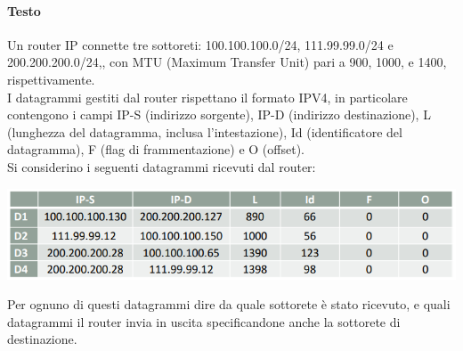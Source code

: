 \documentclass[10pt]{article}
\begin{document}
\paragraph{Testo} Un router IP connette tre sottoreti: 100.100.100.0/24, 111.99.99.0/24 e 200.200.200.0/24,, con MTU (Maximum Transfer Unit) pari a 900, 1000, e 1400, rispettivamente.\\
I datagrammi gestiti dal router rispettano il formato IPV4, in particolare contengono i campi IP-S (indirizzo sorgente), IP-D (indirizzo destinazione), L (lunghezza del datagramma, inclusa l’intestazione), Id (identificatore del datagramma), F (flag di frammentazione) e O (offset).\\
Si considerino i seguenti datagrammi ricevuti dal router:
\begin{center}
\includegraphics[scale=0.7]{ipes2_tabella.png}
\end{center}
Per ognuno di questi datagrammi dire da quale sottorete è stato ricevuto, e quali datagrammi il router invia in uscita specificandone anche la sottorete di destinazione.
\end{document}
